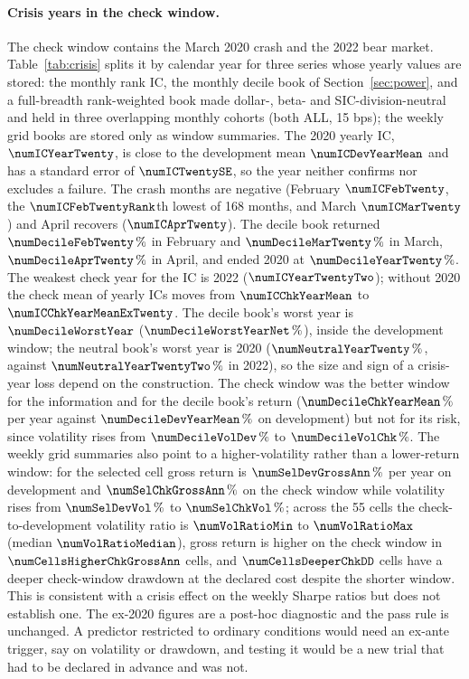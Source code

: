 \paragraph{Crisis years in the check window.}
The check window contains the March 2020 crash and the 2022 bear market. Table~\ref{tab:crisis} splits it by calendar year for three series whose yearly values are stored: the monthly rank IC, the monthly decile book of Section~\ref{sec:power}, and a full-breadth rank-weighted book made dollar-, beta- and SIC-division-neutral and held in three overlapping monthly cohorts (both ALL, 15 bps); the weekly grid books are stored only as window summaries. The 2020 yearly IC, $\numICYearTwenty$, is close to the development mean $\numICDevYearMean$ and has a standard error of $\numICTwentySE$, so the year neither confirms nor excludes a failure. The crash months are negative (February $\numICFebTwenty$, the $\numICFebTwentyRank$th lowest of 168 months, and March $\numICMarTwenty$) and April recovers ($\numICAprTwenty$). The decile book returned $\numDecileFebTwenty\pct$ in February and $\numDecileMarTwenty\pct$ in March, $\numDecileAprTwenty\pct$ in April, and ended 2020 at $\numDecileYearTwenty\pct$. The weakest check year for the IC is 2022 ($\numICYearTwentyTwo$); without 2020 the check mean of yearly ICs moves from $\numICChkYearMean$ to $\numICChkYearMeanExTwenty$. The decile book's worst year is $\numDecileWorstYear$ ($\numDecileWorstYearNet\pct$), inside the development window; the neutral book's worst year is 2020 ($\numNeutralYearTwenty\pct$, against $\numNeutralYearTwentyTwo\pct$ in 2022), so the size and sign of a crisis-year loss depend on the construction. The check window was the better window for the information and for the decile book's return ($\numDecileChkYearMean\pct$ per year against $\numDecileDevYearMean\pct$ on development) but not for its risk, since volatility rises from $\numDecileVolDev\pct$ to $\numDecileVolChk\pct$. The weekly grid summaries also point to a higher-volatility rather than a lower-return window: for the selected cell gross return is $\numSelDevGrossAnn\pct$ per year on development and $\numSelChkGrossAnn\pct$ on the check window while volatility rises from $\numSelDevVol\pct$ to $\numSelChkVol\pct$; across the 55 cells the check-to-development volatility ratio is $\numVolRatioMin$ to $\numVolRatioMax$ (median $\numVolRatioMedian$), gross return is higher on the check window in $\numCellsHigherChkGrossAnn$ cells, and $\numCellsDeeperChkDD$ cells have a deeper check-window drawdown at the declared cost despite the shorter window. This is consistent with a crisis effect on the weekly Sharpe ratios but does not establish one. The ex-2020 figures are a post-hoc diagnostic and the pass rule is unchanged. A predictor restricted to ordinary conditions would need an ex-ante trigger, say on volatility or drawdown, and testing it would be a new trial that had to be declared in advance and was not.

